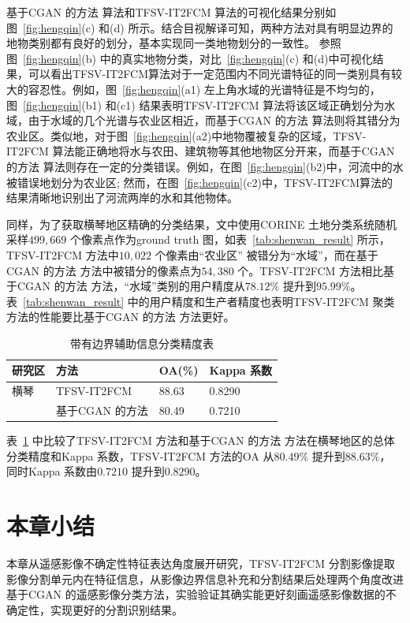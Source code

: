 基于CGAN 的方法 算法和TFSV-IT2FCM 算法的可视化结果分别如图~\ref{fig:hengqin}(c) 和(d) 所示。结合目视解译可知，两种方法对具有明显边界的地物类别都有良好的划分，基本实现同一类地物划分的一致性。 参照图~\ref{fig:hengqin}(b) 中的真实地物分类，对比~\ref{fig:hengqin}(c) 和(d)中可视化结果，可以看出TFSV-IT2FCM算法对于一定范围内不同光谱特征的同一类别具有较大的容忍性。例如，图~\ref{fig:hengqin}(a1) 左上角水域的光谱特征是不均匀的，图~\ref{fig:hengqin}(b1) 和(c1) 结果表明TFSV-IT2FCM 算法将该区域正确划分为水域，由于水域的几个光谱与农业区相近，而基于CGAN 的方法 算法则将其错分为农业区。类似地，对于图~\ref{fig:hengqin}(a2)中地物覆被复杂的区域，TFSV-IT2FCM 算法能正确地将水与农田、建筑物等其他地物区分开来，而基于CGAN 的方法 算法则存在一定的分类错误。例如，在图~\ref{fig:hengqin}(b2)中，河流中的水被错误地划分为农业区; 然而，在图~\ref{fig:hengqin}(c2)中，TFSV-IT2FCM算法的结果清晰地识别出了河流两岸的水和其他物体。



同样，为了获取横琴地区精确的分类结果，文中使用CORINE 土地分类系统随机采样$499,669$ 个像素点作为ground truth 图，如表~\ref{tab:shenwan_result} 所示，TFSV-IT2FCM 方法中$10,022$ 个像素由“农业区” 被错分为“水域”，而在基于CGAN 的方法 方法中被错分的像素点为$54,380$ 个。TFSV-IT2FCM 方法相比基于CGAN 的方法 方法，“水域”类别的用户精度从$78.12\%$ 提升到$95.99\%$。 表~\ref{tab:shenwan_result} 中的用户精度和生产者精度也表明TFSV-IT2FCM 聚类方法的性能要比基于CGAN 的方法 方法更好。

\begin{table}[htbp]
    \caption{带有边界辅助信息分类精度表}\label{tab:hengqin_oa}
    \centering
    \begin{tabular}{llll}
        \toprule
        研究区 & 方法            & OA(\%) & Kappa 系数 \\
        \midrule
        横琴   & TFSV-IT2FCM     & 88.63  & 0.8290     \\
               & 基于CGAN 的方法 & 80.49  & 0.7210     \\
        \bottomrule
    \end{tabular}
\end{table}

表~\ref{tab:hengqin_oa} 中比较了TFSV-IT2FCM 方法和基于CGAN 的方法 方法在横琴地区的总体分类精度和Kappa 系数，TFSV-IT2FCM 方法的OA 从$80.49\%$ 提升到$88.63\%$， 同时Kappa 系数由$0.7210$ 提升到$0.8290$。



\section{本章小结}
\label{sec::chap04-6}
本章从遥感影像不确定性特征表达角度展开研究，TFSV-IT2FCM 分割影像提取影像分割单元内在特征信息，从影像边界信息补充和分割结果后处理两个角度改进基于CGAN 的遥感影像分类方法，实验验证其确实能更好刻画遥感影像数据的不确定性，实现更好的分割识别结果。%
